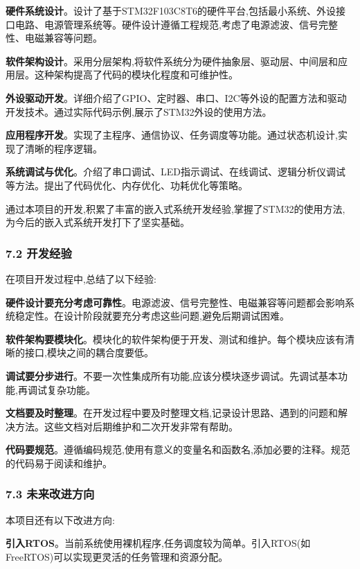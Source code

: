 \documentclass[
]{article}
\begin{document}
\textbf{硬件系统设计}。设计了基于STM32F103C8T6的硬件平台,包括最小系统、外设接口电路、电源管理系统等。硬件设计遵循工程规范,考虑了电源滤波、信号完整性、电磁兼容等问题。

\textbf{软件架构设计}。采用分层架构,将软件系统分为硬件抽象层、驱动层、中间层和应用层。这种架构提高了代码的模块化程度和可维护性。

\textbf{外设驱动开发}。详细介绍了GPIO、定时器、串口、I2C等外设的配置方法和驱动开发技术。通过实际代码示例,展示了STM32外设的使用方法。

\textbf{应用程序开发}。实现了主程序、通信协议、任务调度等功能。通过状态机设计,实现了清晰的程序逻辑。

\textbf{系统调试与优化}。介绍了串口调试、LED指示调试、在线调试、逻辑分析仪调试等方法。提出了代码优化、内存优化、功耗优化等策略。

通过本项目的开发,积累了丰富的嵌入式系统开发经验,掌握了STM32的使用方法,为今后的嵌入式系统开发打下了坚实基础。

\hypertarget{ux5f00ux53d1ux7ecfux9a8c}{%
\subsubsection{7.2 开发经验}\label{ux5f00ux53d1ux7ecfux9a8c}}

在项目开发过程中,总结了以下经验:

\textbf{硬件设计要充分考虑可靠性}。电源滤波、信号完整性、电磁兼容等问题都会影响系统稳定性。在设计阶段就要充分考虑这些问题,避免后期调试困难。

\textbf{软件架构要模块化}。模块化的软件架构便于开发、测试和维护。每个模块应该有清晰的接口,模块之间的耦合度要低。

\textbf{调试要分步进行}。不要一次性集成所有功能,应该分模块逐步调试。先调试基本功能,再调试复杂功能。

\textbf{文档要及时整理}。在开发过程中要及时整理文档,记录设计思路、遇到的问题和解决方法。这些文档对后期维护和二次开发非常有帮助。

\textbf{代码要规范}。遵循编码规范,使用有意义的变量名和函数名,添加必要的注释。规范的代码易于阅读和维护。

\hypertarget{ux672aux6765ux6539ux8fdbux65b9ux5411}{%
\subsubsection{7.3
未来改进方向}\label{ux672aux6765ux6539ux8fdbux65b9ux5411}}

本项目还有以下改进方向:

\textbf{引入RTOS}。当前系统使用裸机程序,任务调度较为简单。引入RTOS(如FreeRTOS)可以实现更灵活的任务管理和资源分配。
\end{document}
